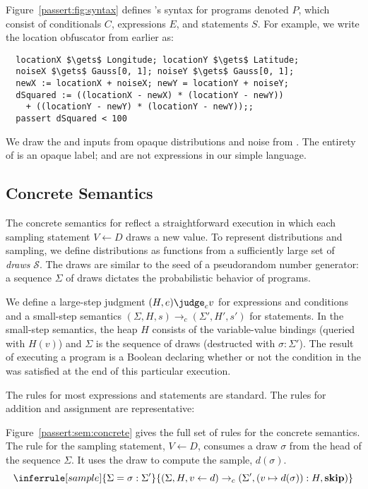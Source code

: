 Figure~\ref{passert:fig:syntax} defines \corelang's syntax for programs denoted
$P$, which consist of conditionals $C$, expressions $E$, and
statements $S$.
For example, we write the
location obfuscator from earlier as:
%
\begin{lstlisting}
  locationX $\gets$ Longitude; locationY $\gets$ Latitude;
  noiseX $\gets$ Gauss[0, 1]; noiseY $\gets$ Gauss[0, 1];
  newX := locationX + noiseX; newY = locationY + noiseY;
  dSquared := ((locationX - newX) * (locationY - newY))
    + ((locationY - newY) * (locationY - newY));;
  passert dSquared < 100
\end{lstlisting}
%
We draw the  and  inputs from opaque
distributions and noise from .
The entirety of  is an opaque label;  and  are not
expressions in our simple language.

\subsection{Concrete Semantics}

The concrete semantics for \corelang reflect a straightforward
execution in which each sampling statement $V \leftarrow D$ draws a
new value.  To represent distributions and sampling, we define
distributions as functions from a sufficiently large set of
\emph{draws} $\mathcal{S}$. The draws are similar to the seed of a
pseudorandom number generator: a sequence $\Sigma$ of draws dictates
the probabilistic behavior of \corelang programs.

We define a large-step judgment $(H, e) \judge_c v$ for expressions
and conditions and a small-step semantics $(\Sigma, H, s) \to_c
(\Sigma', H', s')$ for statements. In the small-step semantics, the
heap $H$ consists of the variable-value bindings (queried with $H(v)$)
and $\Sigma$ is the sequence of draws (destructed with
$\sigma:\Sigma'$).  The result of executing a program is a Boolean
declaring whether or not the condition in the \passert was satisfied
at the end of this particular execution.

The rules for most expressions and statements are standard.  The rules
for addition and assignment are representative:
%
%
Figure~\ref{passert:sem:concrete} gives the full set of rules for the
concrete semantics.
The rule for the sampling statement, $V \leftarrow D$, %
consumes a draw $\sigma$ from the head of the
sequence $\Sigma$.
It uses the draw to compute the sample, $d(\sigma)$.
%
\[
  \inferrule[sample]{\Sigma = \sigma:\Sigma'}
            {(\Sigma, H, v \leftarrow d) \to_c (\Sigma',(v \mapsto d(\sigma)):H,
                \mathbf{skip})}
\]


